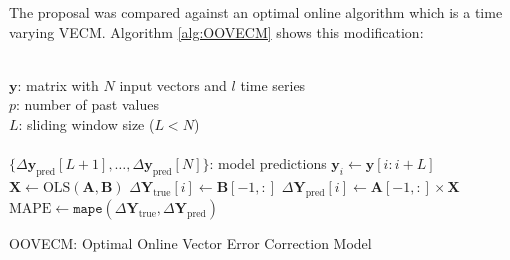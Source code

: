 \documentclass[twocolumn]{svjour3}          %
\begin{document}
The proposal was compared against an optimal online algorithm which is a time varying
VECM. Algorithm \ref{alg:OOVECM} shows this modification:
\begin{algorithm}[ht]
\begin{algorithmic}[1]
\REQUIRE $\,$ \\
$\mathbf{y}$: matrix with $N$ input vectors and $l$ time series\\
$p$: number of past values \\
$L$: sliding window size ($L<N$) \\
\ENSURE  $\,$ \\
$\{\Delta \mathbf{y}_{\text{pred}}[L+1],\dots,\Delta \mathbf{y}_{\text{pred}}[N]\}$: model predictions 
    \STATE $\mathbf{y}_i \gets \mathbf{y}[i:i+L]$
    \STATE $\mathbf{X} \gets \text{OLS} (\mathbf{A},\mathbf{B})$%
    \STATE $\Delta \mathbf{Y}_{\text{true}}[i] \gets \mathbf{B}[-1,:]$
    \STATE $\Delta \mathbf{Y}_{\text{pred}}[i] \gets \mathbf{A}[-1,:] \times \mathbf{X}$
\ENDFOR
    \STATE $\text{MAPE} \gets \texttt{mape}(\Delta \mathbf{Y}_{\text{true}}, \Delta
    \mathbf{Y}_{\text{pred}})$
\end{algorithmic}
\caption{OOVECM: Optimal Online Vector Error Correction Model}
\label{alg:OOVECM}
\end{algorithm}
\end{document}
